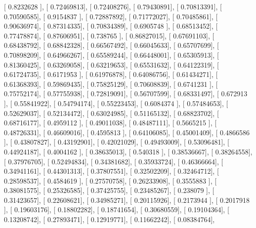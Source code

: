 \documentclass{article}
\begin{document}
       [ 0.8232628 ],
       [ 0.72469813],
       [ 0.72408276],
       [ 0.79430891],
       [ 0.70813391],
       [ 0.70590585],
       [ 0.9154837 ],
       [ 0.72887892],
       [ 0.71772027],
       [ 0.70485861],
       [ 0.90636974],
       [ 0.87314335],
       [ 0.70834389],
       [ 0.6905748 ],
       [ 0.68513452],
       [ 0.77478874],
       [ 0.87606951],
       [ 0.738765  ],
       [ 0.86827015],
       [ 0.67691103],
       [ 0.68438792],
       [ 0.68842328],
       [ 0.66567492],
       [ 0.66045633],
       [ 0.65707699],
       [ 0.70898209],
       [ 0.64966267],
       [ 0.65589244],
       [ 0.66448001],
       [ 0.65305913],
       [ 0.81360425],
       [ 0.63269058],
       [ 0.63219653],
       [ 0.65531632],
       [ 0.64122319],
       [ 0.61724735],
       [ 0.6171953 ],
       [ 0.61976878],
       [ 0.64086756],
       [ 0.61434271],
       [ 0.61368393],
       [ 0.59869435],
       [ 0.75825129],
       [ 0.70608839],
       [ 0.6741231 ],
       [ 0.75752174],
       [ 0.57755938],
       [ 0.72819091],
       [ 0.56707599],
       [ 0.68331497],
       [ 0.672913  ],
       [ 0.55841922],
       [ 0.54794174],
       [ 0.55223453],
       [ 0.6084374 ],
       [ 0.57484653],
       [ 0.52629037],
       [ 0.52134472],
       [ 0.63024985],
       [ 0.51165132],
       [ 0.68823702],
       [ 0.68716177],
       [ 0.4959112 ],
       [ 0.49011038],
       [ 0.48487111],
       [ 0.5665215 ],
       [ 0.48726331],
       [ 0.46609016],
       [ 0.4595813 ],
       [ 0.64106085],
       [ 0.45001409],
       [ 0.4866586 ],
       [ 0.43807827],
       [ 0.43192901],
       [ 0.42021029],
       [ 0.49493009],
       [ 0.53096481],
       [ 0.44924187],
       [ 0.4004162 ],
       [ 0.38635013],
       [ 0.540318  ],
       [ 0.38536667],
       [ 0.38264558],
       [ 0.37976705],
       [ 0.52494834],
       [ 0.34381682],
       [ 0.35933724],
       [ 0.46366664],
       [ 0.34941161],
       [ 0.44301313],
       [ 0.37807551],
       [ 0.32502209],
       [ 0.32464712],
       [ 0.28598537],
       [ 0.4584619 ],
       [ 0.27570758],
       [ 0.26233908],
       [ 0.3555883 ],
       [ 0.38081575],
       [ 0.25326585],
       [ 0.37425755],
       [ 0.23485267],
       [ 0.238079  ],
       [ 0.31423657],
       [ 0.22608621],
       [ 0.34985271],
       [ 0.20115926],
       [ 0.2173944 ],
       [ 0.2017918 ],
       [ 0.19603176],
       [ 0.18802282],
       [ 0.18741654],
       [ 0.30680559],
       [ 0.19104364],
       [ 0.13208742],
       [ 0.27893471],
       [ 0.12919771],
       [ 0.11662242],
       [ 0.08384764],
\end{document}
